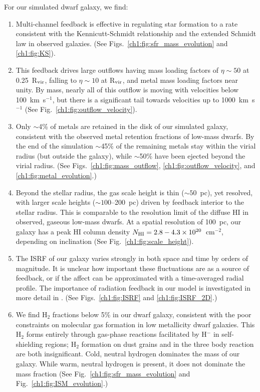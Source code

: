 For our simulated dwarf galaxy, we find:
\begin{enumerate}
\item Multi-channel feedback is effective in regulating star formation to a rate consistent with the Kennicutt-Schmidt relationship and the extended Schmidt law in observed galaxies. (See Figs.~\ref{ch1:fig:sfr_mass_evolution} and \ref{ch1:fig:KS}).

\item This feedback drives large outflows having mass loading factors of $\eta \sim 50$ at 0.25~R$_{\rm vir}$, falling to $\eta \sim 10$ at R$_{\rm vir}$,  and
metal mass loading factors near unity. By mass, nearly all of this outflow is moving with velocities below 100~km~s$^{-1}$, but there is a significant tail towards velocities up to 1000~km~s$^{-1}$ (See Fig.~\ref{ch1:fig:outflow_velocity}).

\item
Only $\sim$4\% of metals are retained in the disk of our simulated galaxy, consistent with the observed metal retention fractions of low-mass dwarfs.  By the end of the simulation $\sim$45\% of the remaining metals stay within the virial radius (but outside the galaxy), while $\sim$50\%
have been ejected beyond the virial radius. (See Figs.~\ref{ch1:fig:mass_outflow}, \ref{ch1:fig:outflow_velocity}, and \ref{ch1:fig:metal_evolution}.)

\item
Beyond the stellar radius, the gas scale height is thin ($\sim 50$~pc), yet resolved, with larger scale heights ($\sim 100$--200~pc) driven by feedback interior to the stellar radius. This is comparable to the resolution limit of the diffuse HI in observed, gaseous low-mass dwarfs. At a spatial resolution of 100~pc, our galaxy has a peak HI column density $N_{\rm HI} = 2.8-4.3 \times 10^{20}$~cm$^{-2}$, depending on inclination (See Fig.~\ref{ch1:fig:scale_height}).

\item The ISRF of our galaxy varies strongly in both space and time by orders of magnitude. It is unclear how important these fluctuations are as a source of feedback, or if the affect can be approximated with a time-averaged radial profile. The importance of radiation feedback in our model is investigated in more detail in \cite{Emerick2018b}. (See Figs.~\ref{ch1:fig:ISRF} and \ref{ch1:fig:ISRF_2D}.)

\item
We find H$_2$ fractions below 5\% in our dwarf galaxy, consistent with the poor constraints on molecular gas formation in low metallicity dwarf galaxies. This H$_2$ forms entirely through gas-phase reactions facilitated by H$^{-}$ in self-shielding regions; H$_2$ formation on dust grains and in the three body reaction are both insignificant. Cold, neutral hydrogen dominates the mass of our galaxy. While warm, neutral hydrogen is present, it does not dominate the mass fraction (See Fig.~\ref{ch1:fig:sfr_mass_evolution} and Fig.~\ref{ch1:fig:ISM_evolution}.)


\end{enumerate}
